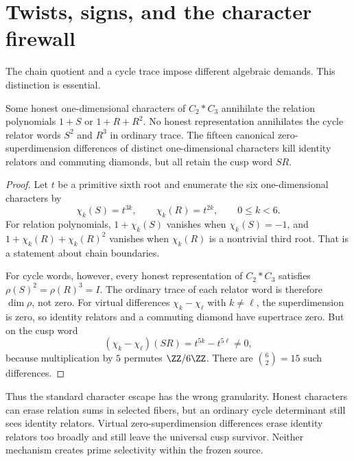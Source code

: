 \section{Twists, signs, and the character firewall}
\label{sec:twists}

The chain quotient and a cycle trace impose different algebraic demands.  This
distinction is essential.

\begin{proposition}
\label{prop:characters}
Some honest one-dimensional characters of $C_2*C_3$ annihilate the relation
polynomials $1+S$ or $1+R+R^2$.  No honest representation annihilates the
cycle relator words $S^2$ and $R^3$ in ordinary trace.  The fifteen canonical
zero-superdimension differences of distinct one-dimensional characters kill
identity relators and commuting diamonds, but all retain the cusp word $SR$.
\end{proposition}

\begin{proof}
Let $t$ be a primitive sixth root and enumerate the six one-dimensional
characters by
\[
  \chi_k(S)=t^{3k},\qquad \chi_k(R)=t^{2k},\qquad 0\le k<6 .
\]
For relation polynomials, $1+\chi_k(S)$ vanishes when $\chi_k(S)=-1$, and
$1+\chi_k(R)+\chi_k(R)^2$ vanishes when $\chi_k(R)$ is a nontrivial third
root.  That is a statement about chain boundaries.

For cycle words, however, every honest representation of $C_2*C_3$ satisfies
$\rho(S)^2=\rho(R)^3=I$.  The ordinary trace of each relator word is therefore
$\dim\rho$, not zero.  For virtual differences $\chi_k-\chi_\ell$ with
$k\ne\ell$, the superdimension is zero, so identity relators and a commuting
diamond have supertrace zero.  But on the cusp word
\[
  (\chi_k-\chi_\ell)(SR)=t^{5k}-t^{5\ell}\ne0,
\]
because multiplication by $5$ permutes $\ZZ/6\ZZ$.  There are
$\binom 62=15$ such differences.
\end{proof}

Thus the standard character escape has the wrong granularity.  Honest
characters can erase relation sums in selected fibers, but an ordinary cycle
determinant still sees identity relators.  Virtual zero-superdimension
differences erase identity relators too broadly and still leave the universal
cusp survivor.  Neither mechanism creates prime selectivity within the frozen
source.
